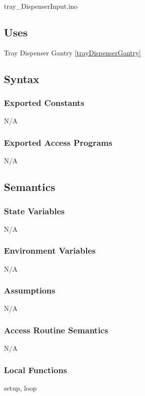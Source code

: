 \documentclass[12pt, titlepage]{article}
\begin{document}
tray\_DispenserInput.ino

\subsection{Uses}
Tray Dispenser Gantry \ref{trayDispenserGantry}

\subsection{Syntax}

\subsubsection{Exported Constants}
N/A
\subsubsection{Exported Access Programs}

N/A

\subsection{Semantics}

\subsubsection{State Variables}

N/A
\subsubsection{Environment Variables}

N/A

\subsubsection{Assumptions}

N/A

\subsubsection{Access Routine Semantics}

N/A

\subsubsection{Local Functions}

setup, loop
\end{document}
